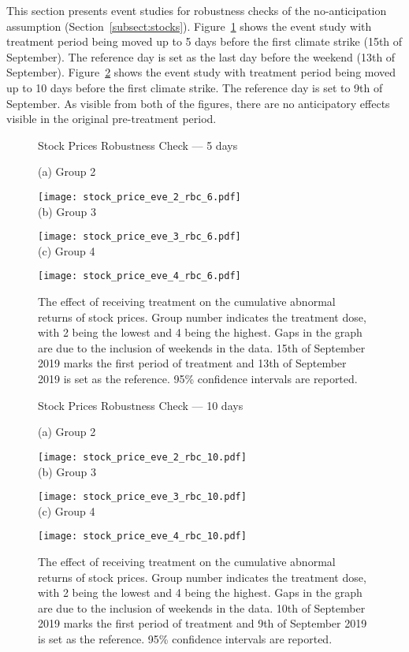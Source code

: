 \documentclass[12pt]{article}
\begin{document}
This section presents event studies for robustness checks of the no-anticipation assumption (Section~\ref{subsect:stocks}). Figure~\ref{fig:eve_stock_rbc_6} shows the event study with treatment period being moved up to 5 days before the first climate strike (15th of September). The reference day is set as the last day before the weekend (13th of September). Figure~\ref{fig:eve_stock_rbc_10} shows the event study with treatment period being moved up to 10 days before the first climate strike. The reference day is set to 9th of September. As visible from both of the figures, there are no anticipatory effects visible in the original pre-treatment period.

\begin{figure}
    \caption{Stock Prices Robustness Check --- 5 days}\label{fig:eve_stock_rbc_6}
    \centering
    
    (a) Group 2
    
    \texttt{[image: stock\_price\_eve\_2\_rbc\_6.pdf]} \\
    
    (b) Group 3
    
    \texttt{[image: stock\_price\_eve\_3\_rbc\_6.pdf]} \\
    
    (c) Group 4
    
    \texttt{[image: stock\_price\_eve\_4\_rbc\_6.pdf]}
    
    \captionsetup{font=footnotesize}
    \caption*{The effect of receiving treatment on the cumulative abnormal returns of stock prices. Group number indicates the treatment dose, with 2 being the lowest and 4 being the highest. Gaps in the graph are due to the inclusion of weekends in the data. 15th of September 2019 marks the first period of treatment and 13th of September 2019 is set as the reference. 95\% confidence intervals are reported.}
\end{figure}

\begin{figure}
    \caption{Stock Prices Robustness Check --- 10 days}\label{fig:eve_stock_rbc_10}
    \centering
    
    (a) Group 2
    
    \texttt{[image: stock\_price\_eve\_2\_rbc\_10.pdf]} \\
    
    (b) Group 3
    
    \texttt{[image: stock\_price\_eve\_3\_rbc\_10.pdf]} \\
    
    (c) Group 4
    
    \texttt{[image: stock\_price\_eve\_4\_rbc\_10.pdf]}
    
    \captionsetup{font=footnotesize}
    \caption*{The effect of receiving treatment on the cumulative abnormal returns of stock prices. Group number indicates the treatment dose, with 2 being the lowest and 4 being the highest. Gaps in the graph are due to the inclusion of weekends in the data. 10th of September 2019 marks the first period of treatment and 9th of September 2019 is set as the reference. 95\% confidence intervals are reported.}
\end{figure}
\end{document}
